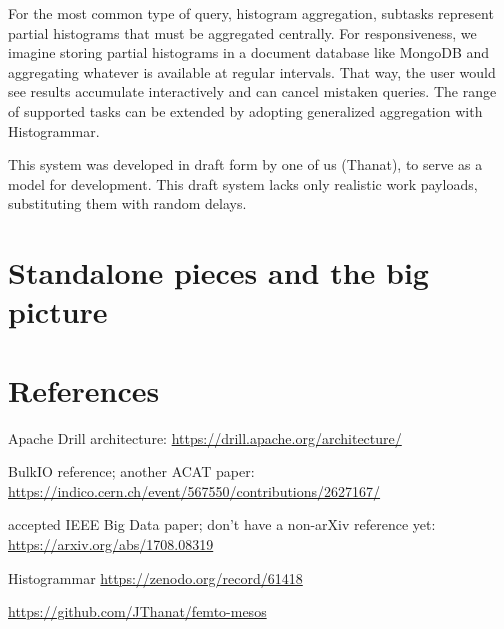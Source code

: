 \documentclass[a4paper]{jpconf}
\begin{document}
For the most common type of query, histogram aggregation, subtasks represent partial histograms that must be aggregated centrally. For responsiveness, we imagine storing partial histograms in a document database like MongoDB and aggregating whatever is available at regular intervals. That way, the user would see results accumulate interactively and can cancel mistaken queries. The range of supported tasks can be extended by adopting generalized aggregation with Histogrammar\cite{histogrammar}.

This system was developed in draft form by one of us (Thanat)\cite{thanat}, to serve as a model for development. This draft system lacks only realistic work payloads, substituting them with random delays.

\section{Standalone pieces and the big picture}






\section*{References}
\begin{thebibliography}{9}

 Apache Drill architecture: \url{https://drill.apache.org/architecture/}

 BulkIO reference; another ACAT paper: \url{https://indico.cern.ch/event/567550/contributions/2627167/}

 accepted IEEE Big Data paper; don't have a non-arXiv reference yet: \url{https://arxiv.org/abs/1708.08319}

 Histogrammar \url{https://zenodo.org/record/61418}

 \url{https://github.com/JThanat/femto-mesos}

\end{thebibliography}
\end{document}
